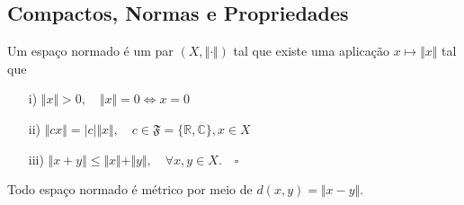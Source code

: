 \documentclass[measure_theory.tex]{subfiles}
\begin{document}
\subsection{Compactos, Normas e Propriedades}
\begin{def*}
	Um espaço normado é um par \((X, \Vert \cdot  \Vert)\) tal que existe uma aplicação \(x \mapsto \Vert x \Vert\) tal que
	\begin{itemize}
		\item[i)] \(\Vert x \Vert > 0,\quad \Vert x \Vert = 0 \Longleftrightarrow x = 0\)
		\item[ii)] \(\Vert cx \Vert = |c|\Vert x \Vert, \quad c\in \mathfrak{F} = \{\mathbb{R}, \mathbb{C}\}, x\in X\)
		\item[iii)] \(\Vert x + y \Vert \leq \Vert x \Vert + \Vert y \Vert,\quad \forall x, y\in X.\quad \square\)
	\end{itemize}
\end{def*}
Todo espaço normado é métrico por meio de \(d(x, y) = \Vert x - y \Vert\).
\end{document}
